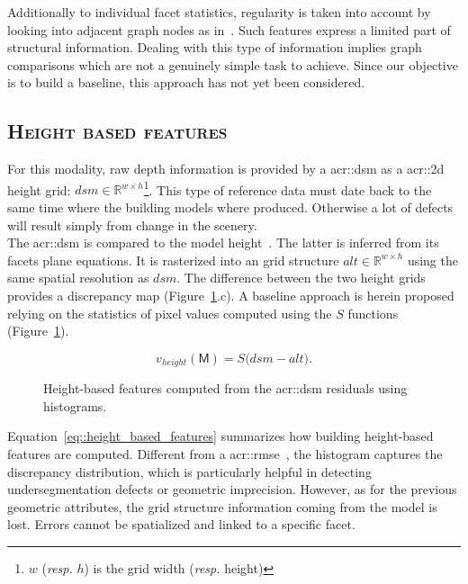         Additionally to individual facet statistics, regularity is taken into account by looking into adjacent graph nodes as in~\parencite{zhou20102}.
        Such features express a limited  part of structural information.
        Dealing with this type of information implies graph comparisons which are not a genuinely simple task to achieve.
        Since our objective is to build a baseline, this approach has not yet been considered.

    \subsection{\textsc{Height based features}}
        \label{subsec::learned_evaluation::baseline::height}
        For this modality, raw depth information is provided by a \gls{acr::dsm} as a \gls{acr::2d} height grid: $dsm \in \mathbb{R}^{w\times h}$\footnote{$w$ (\textit{resp.} $h$) is the grid width (\textit{resp.} height)}.
        This type of reference data must date back to the same time where the building models where produced.
        Otherwise a lot of defects will result simply from change in the scenery.\\

        The \gls{acr::dsm} is compared to the model height~\parencite{bredif20073d,zebedin2008fusion}.
        The latter is inferred from its facets plane equations.
        It is rasterized into an grid structure $alt \in \mathbb{R}^{w\times h}$ using the same spatial resolution as $dsm$.
        The difference between the two height grids provides a discrepancy map (Figure~\ref{fig::height_based_features}.c).
        A baseline approach is herein proposed relying on the statistics of pixel values computed using the $S$ functions (Figure~\ref{fig::height_based_features}).

        \begin{equation}
            \label{eq::height_based_features}
            v_{height}(\mathsf{M}) = S\big( dsm - alt \big).
        \end{equation}
        \begin{figure}[htpb]
            \centering
            
            \caption{
                \label{fig::height_based_features}
                Height-based features computed from the \gls{acr::dsm} residuals using histograms.
            }
        \end{figure}

        Equation~\ref{eq::height_based_features} summarizes how building height-based features are computed.
        Different from a \gls{acr::rmse}~\parencite{lafarge2012creating,poullis2013framework}, the histogram captures the discrepancy distribution, which is particularly helpful in detecting undersegmentation defects or geometric imprecision.
        However, as for the previous geometric attributes, the grid structure information coming from the model is lost.
        Errors cannot be spatialized and linked to a specific facet.


